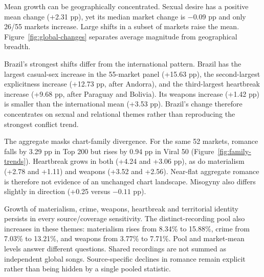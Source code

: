 \documentclass[10pt,a4paper,twocolumn]{article}
\begin{document}
Mean growth can be geographically concentrated. Sexual desire has a positive mean change (+2.31 pp), yet its median market change is $-0.09$ pp and only 26/55 markets increase. Large shifts in a subset of markets raise the mean. Figure~\ref{fig:global-changes} separates average magnitude from geographical breadth.

Brazil's strongest shifts differ from the international pattern. Brazil has the largest casual-sex increase in the 55-market panel (+15.63 pp), the second-largest explicitness increase (+12.73 pp, after Andorra), and the third-largest heartbreak increase (+9.68 pp, after Paraguay and Bolivia). Its weapons increase (+1.42 pp) is smaller than the international mean (+3.53 pp). Brazil's change therefore concentrates on sexual and relational themes rather than reproducing the strongest conflict trend.

The aggregate masks chart-family divergence. For the same 52 markets, romance falls by 3.29 pp in Top 200 but rises by 0.94 pp in Viral 50 (Figure~\ref{fig:family-trends}). Heartbreak grows in both (+4.24 and +3.06 pp), as do materialism (+2.78 and +1.11) and weapons (+3.52 and +2.56). Near-flat aggregate romance is therefore not evidence of an unchanged chart landscape. Misogyny also differs slightly in direction (+0.25 versus $-0.11$ pp).

Growth of materialism, crime, weapons, heartbreak and territorial identity persists in every source/coverage sensitivity. The distinct-recording pool also increases in these themes: materialism rises from 8.34\% to 15.88\%, crime from 7.03\% to 13.21\%, and weapons from 3.77\% to 7.71\%. Pool and market-mean levels answer different questions. Shared recordings are not summed as independent global songs. Source-specific declines in romance remain explicit rather than being hidden by a single pooled statistic.
\end{document}
